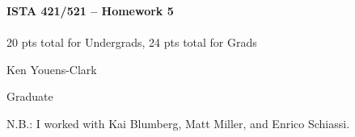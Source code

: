 \documentclass[10pt]{article}
\begin{document}
\begin{center}
    {\Large {\bf ISTA 421/521 -- Homework 5}} \\
     \\
    20 pts total for Undergrads, 24 pts total for Grads\\
    
\end{center}

\begin{flushright}
Ken Youens-Clark

Graduate 
\end{flushright}

\vspace{1cm}

N.B.: I worked with Kai Blumberg, Matt Miller, and Enrico Schiassi.
\end{document}
